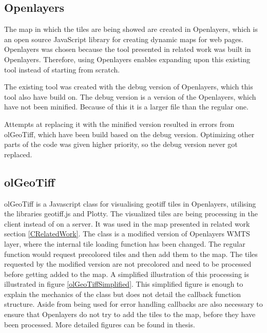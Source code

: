 \subsection*{Openlayers}
The map in which the tiles are being showed are created in Openlayers, which is an open source JavaScript library for creating dynamic maps for web pages. 
\citep{OL}
Openlayers was chosen because the tool presented in related work was built in Openlayers. Therefore, using Openlayers enables expanding upon this existing tool instead of starting from scratch. 

The existing tool was created with the debug version of Openlayers, which this tool also have build on. The debug version is a version of the Openlayers, which have not been minified. Because of this it is a larger file than the regular one. \citep{MappaGnosis}

Attempts at replacing it with the minified version resulted in errors from olGeoTiff, which have been build based on the debug version. Optimizing other parts of the code was given higher priority, so the debug version never got replaced. 

\subsection*{olGeoTiff}\label{HowOlGeotiffWorks}
olGeoTiff is a Javascript class for visualising geotiff tiles in Openlayers, utilising the libraries geotiff.js and Plotty. The visualized tiles are being processing in the client instead of on a server. It was used in the map presented in related work section \ref{CRelatedWork}. 
The class is a modified version of Openlayers WMTS layer, where the internal tile loading function has been changed. The regular function would request precolored tiles and then add them to the map. The tiles requested by the modified version are not precolored and need to be processed before getting added to the map. A simplified illustration of this processing is illustrated in figure \ref{olGeoTiffSimplified}. This simplified figure is enough to explain the mechanics of the class but does not detail the callback function structure. Aside from being used for error handling callbacks are also necessary to ensure that Openlayers do not try to add the tiles to the map, before they have been processed. More detailed figures can be found in \citep{Baumrocks} thesis.

